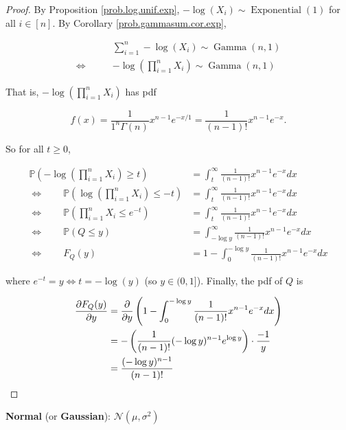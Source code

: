 \begin{proof}

By Proposition \ref{prob.log.unif.exp}, \(- \log(X_i) \sim \operatorname{Exponential}(1)\) for all \(i \in [n]\). By Corollary \ref{prob.gammasum.cor.exp}, 

\begin{align*}
& \sum_{i=1}^n -\log(X_i) \sim \operatorname{Gamma}(n, 1)
\\ \iff \qquad &  -\log \left(\prod_{i=1}^nX_i \right ) \sim \operatorname{Gamma}(n, 1)
\end{align*}

That is, \( -\log \left(\prod_{i=1}^nX_i \right)\) has pdf 

\[
f(x)  = \frac{1}{1^n\Gamma(n)} x^{n - 1} e^{-x/1}  = \frac{1}{(n-1)!} x^{n - 1} e^{-x}.  
\]

So for all \(t \geq0\),

\begin{align*}
\mathbb{P}\left(  -\log \left(\prod_{i=1}^nX_i \right) \geq t\right)  & = \int_t^\infty\frac{1}{(n-1)!} x^{n - 1} e^{-x}dx
\\ \iff \qquad \mathbb{P}\left(  \log \left(\prod_{i=1}^nX_i \right) \leq -t\right)  & = \int_t^\infty\frac{1}{(n-1)!} x^{n - 1} e^{-x}dx
\\ \iff \qquad \mathbb{P}\left(  \prod_{i=1}^nX_i  \leq e^{-t}\right)  & = \int_t^\infty\frac{1}{(n-1)!} x^{n - 1} e^{-x}dx
\\ \iff \qquad \mathbb{P}\left(  Q  \leq y \right)  & = \int_{-\log y}^\infty\frac{1}{(n-1)!} x^{n - 1} e^{-x}dx
\\ \iff \qquad F_Q(y)  & = 1 - \int_{0}^{-\log y} \frac{1}{(n-1)!} x^{n - 1} e^{-x}dx
\end{align*}

where \(e^{-t} = y \iff t = -\log(y)\) (so \(y \in (0,1]\)). Finally, the pdf of \(Q\) is

\begin{align*}
\frac{\partial F_Q(y)}{\partial y} & = \frac{\partial }{\partial y} \left(  1 - \int_{0}^{-\log y} \frac{1}{(n-1)!} x^{n - 1} e^{-x}dx \right)
\\ & =   - \left( \frac{1}{(n-1)!} (- \log y)^{n - 1} e^{\log y } \right)\cdot \frac{-1}{y}
\\ & =   \frac{(- \log y)^{n - 1} }{(n-1)!} 
\end{align*}

\end{proof}

\textbf{Normal} (or \textbf{Gaussian}): \(\mathcal{N}(\mu, \sigma^2)\)

